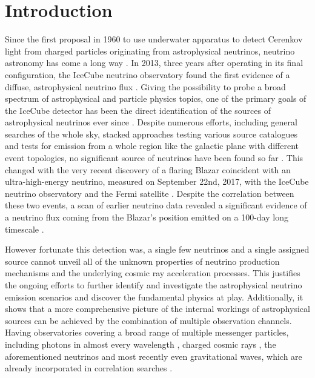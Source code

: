 \chapter{Introduction}

Since the first proposal in  1960 to use underwater apparatus to detect Cerenkov light from charged particles originating from astrophysical neutrinos, neutrino astronomy has come a long way .
In 2013, three years after operating in its final configuration, the IceCube neutrino observatory found the first evidence of a diffuse, astrophysical neutrino flux .
Giving the possibility to probe a broad spectrum of astrophysical and particle physics topics, one of the primary goals of the IceCube detector has been the direct identification of the sources of astrophysical neutrinos ever since .
Despite numerous efforts, including general searches of the whole sky, stacked approaches testing various source catalogues and tests for emission from a whole region like the galactic plane with different event topologies, no significant source of neutrinos have been found so far .
This changed with the very recent discovery of a flaring Blazar coincident with an ultra-high-energy neutrino, measured on September 22nd, 2017, with the IceCube neutrino observatory and the Fermi satellite .
Despite the correlation between these two events, a scan of earlier neutrino data revealed a significant evidence of a neutrino flux coming from the Blazar's position emitted on a 100-day long timescale .

However fortunate this detection was, a single few neutrinos and a single assigned source cannot unveil all of the unknown properties of neutrino production mechanisms and the underlying cosmic ray acceleration processes.
This justifies the ongoing efforts to further identify and investigate the astrophysical neutrino emission scenarios and discover the fundamental physics at play.
Additionally, it shows that a more comprehensive picture of the internal workings of astrophysical sources can be achieved by the combination of multiple observation channels.
Having observatories covering a broad range of multiple messenger particles, including photons in almost every wavelength , charged cosmic rays , the aforementioned neutrinos and most recently even gravitational waves, which are already incorporated in correlation searches .

